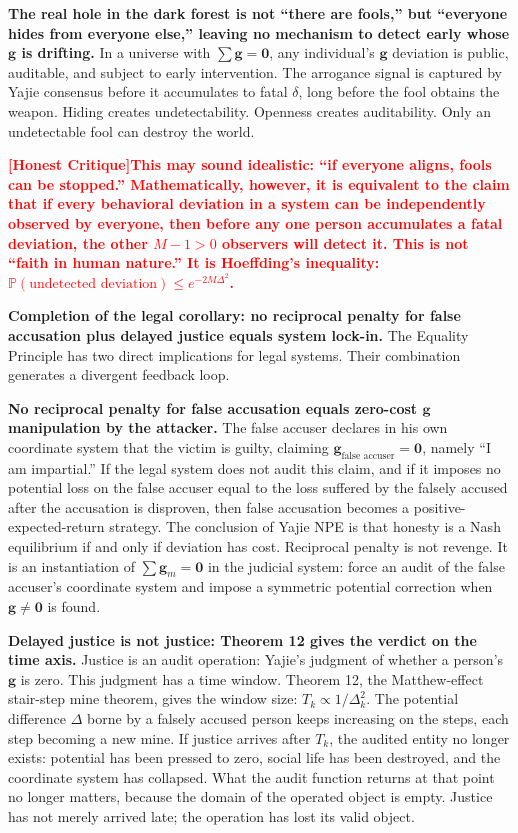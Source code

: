 \documentclass[12pt,a4paper]{article}
\theoremstyle{remark}
\newcommand{\Pbb}{\mathbb{P}}
\newcommand{\honestcrit}[1]{%
    \textcolor{red}{\textbf{[Honest Critique]#1}}%
}
\begin{document}
\textbf{The real hole in the dark forest is not ``there are fools,'' but ``everyone hides from everyone else,'' leaving no mechanism to detect early whose $\mathbf{g}$ is drifting.} In a universe with $\sum\mathbf{g} = \mathbf{0}$, any individual's $\mathbf{g}$ deviation is public, auditable, and subject to early intervention. The arrogance signal is captured by Yajie consensus before it accumulates to fatal $\delta$, long before the fool obtains the weapon. Hiding creates undetectability. Openness creates auditability. Only an undetectable fool can destroy the world.

\honestcrit{This may sound idealistic: ``if everyone aligns, fools can be stopped.'' Mathematically, however, it is equivalent to the claim that if every behavioral deviation in a system can be independently observed by everyone, then before any one person accumulates a fatal deviation, the other $M-1 > 0$ observers will detect it. This is not ``faith in human nature.'' It is Hoeffding's inequality: $\Pbb(\text{undetected deviation}) \leq e^{-2M\Delta^2}$.}

\textbf{Completion of the legal corollary: no reciprocal penalty for false accusation plus delayed justice equals system lock-in.} The Equality Principle has two direct implications for legal systems. Their combination generates a divergent feedback loop.

\textbf{No reciprocal penalty for false accusation equals zero-cost $\mathbf{g}$ manipulation by the attacker.} The false accuser declares in his own coordinate system that the victim is guilty, claiming $\mathbf{g}_{\text{false accuser}} = \mathbf{0}$, namely ``I am impartial.'' If the legal system does not audit this claim, and if it imposes no potential loss on the false accuser equal to the loss suffered by the falsely accused after the accusation is disproven, then false accusation becomes a positive-expected-return strategy. The conclusion of Yajie NPE is that honesty is a Nash equilibrium if and only if deviation has cost. Reciprocal penalty is not revenge. It is an instantiation of $\sum\mathbf{g}_m = \mathbf{0}$ in the judicial system: force an audit of the false accuser's coordinate system and impose a symmetric potential correction when $\mathbf{g} \neq \mathbf{0}$ is found.

\textbf{Delayed justice is not justice: Theorem 12 gives the verdict on the time axis.} Justice is an audit operation: Yajie's judgment of whether a person's $\mathbf{g}$ is zero. This judgment has a time window. Theorem 12, the Matthew-effect stair-step mine theorem, gives the window size: $T_k \propto 1/\Delta_k^2$. The potential difference $\Delta$ borne by a falsely accused person keeps increasing on the steps, each step becoming a new mine. If justice arrives after $T_k$, the audited entity no longer exists: potential has been pressed to zero, social life has been destroyed, and the coordinate system has collapsed. What the audit function returns at that point no longer matters, because the domain of the operated object is empty. Justice has not merely arrived late; the operation has lost its valid object.
\end{document}
